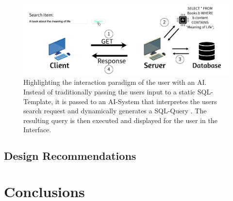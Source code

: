 \documentclass[manuscript,review]{acmart}
\begin{document}
\begin{figure}[h]
  \includegraphics[width=\textwidth]{images/front_image}
  \caption{Highlighting the interaction paradigm of the user with an AI. Instead
  of traditionally passing the users input to a static SQL-Template, it is passed 
  to an AI-System that interpretes the users search request and dynamically generates a SQL-Query
  . The resulting query is then executed and displayed for the user in the Interface.}
\end{figure}












\subsection{Design Recommendations}

\section{Conclusions}




\end{document}
